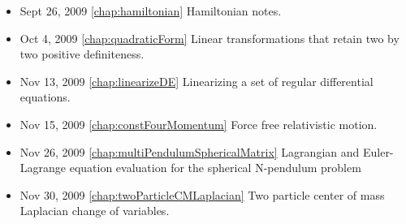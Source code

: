 \begin{itemize}
\item Sept 26, 2009 \ref{chap:hamiltonian} Hamiltonian notes.

\item Oct 4, 2009 \ref{chap:quadraticForm} Linear transformations that retain two by two positive definiteness.

\item Nov 13, 2009 \ref{chap:linearizeDE} Linearizing a set of regular differential equations.

\item Nov 15, 2009 \ref{chap:constFourMomentum} Force free relativistic motion.

\item Nov 26, 2009 \ref{chap:multiPendulumSphericalMatrix} Lagrangian and Euler-Lagrange equation evaluation for the spherical N-pendulum problem

\item Nov 30, 2009 \ref{chap:twoParticleCMLaplacian} Two particle center of mass Laplacian change of variables.

\end{itemize}
